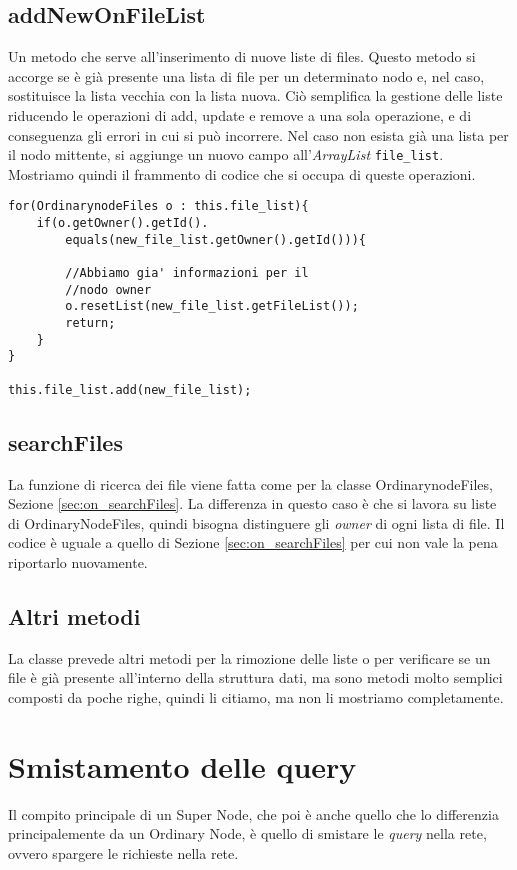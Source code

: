 \subsection{addNewOnFileList}
Un metodo che serve all'inserimento di nuove liste di files. Questo metodo si accorge se è già presente una lista di file per un determinato nodo e, nel caso, sostituisce la lista vecchia con la lista nuova.
Ciò semplifica la gestione delle liste riducendo le operazioni di add, update e remove a una sola operazione, e di conseguenza gli errori in cui si può incorrere.
Nel caso non esista già una lista per il nodo mittente, si aggiunge un nuovo campo all'\emph{ArrayList} \verb|file_list|.
Mostriamo quindi il frammento di codice che si occupa di queste operazioni.
\begin{lstlisting}
for(OrdinarynodeFiles o : this.file_list){
	if(o.getOwner().getId().
		equals(new_file_list.getOwner().getId())){

		//Abbiamo gia' informazioni per il
		//nodo owner
		o.resetList(new_file_list.getFileList());
		return;
	}
}

this.file_list.add(new_file_list);
\end{lstlisting}

\subsection{searchFiles}
La funzione di ricerca dei file viene fatta come per la classe OrdinarynodeFiles, Sezione \ref{sec:on_searchFiles}.
La differenza in questo caso è che si lavora su liste di OrdinaryNodeFiles, quindi bisogna distinguere gli \emph{owner} di ogni lista di file.
Il codice è uguale a quello di Sezione \ref{sec:on_searchFiles} per cui non vale la pena riportarlo nuovamente.

\subsection{Altri metodi}
La classe prevede altri metodi per la rimozione delle liste o per verificare se un file è già presente all'interno della struttura dati, ma sono metodi molto semplici composti da poche righe, quindi li citiamo, ma non li mostriamo completamente.

\section{Smistamento delle query}\label{sec:smistamento_delle_query}
Il compito principale di un Super Node, che poi è anche quello che lo differenzia principalemente da un Ordinary Node, è quello di smistare le \emph{query} nella rete, ovvero spargere le richieste nella rete.


